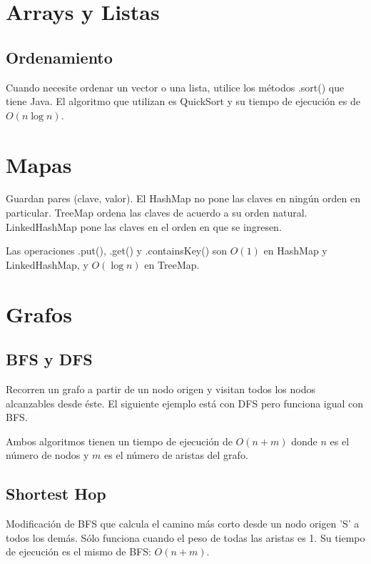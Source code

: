 \documentclass{article}
\begin{document}
\begin{multicols}{2}
\section{Arrays y Listas}
	\subsection{Ordenamiento}
	Cuando necesite ordenar un vector o una lista, utilice los métodos .sort() que tiene 		Java. El algoritmo que utilizan es QuickSort y su tiempo de ejecución es de \( O(n\log n) \).
	

\section{Mapas}
Guardan pares (clave, valor). El HashMap no pone las claves en ningún orden en particular. TreeMap ordena las claves de acuerdo a su orden natural. LinkedHashMap pone las claves en el orden en que se ingresen.

Las operaciones .put(), .get() y .containsKey() son \( O(1) \) en HashMap y LinkedHashMap, y \( O(\log n)\) en TreeMap.


\section{Grafos}
	\subsection{BFS y DFS}
	Recorren un grafo a partir de un nodo origen y visitan todos los nodos alcanzables desde éste. El siguiente ejemplo está con DFS pero funciona igual con BFS. 
	
	Ambos algoritmos tienen un tiempo de ejecución de \( O(n + m) \) donde \( n \) es el número de nodos y \( m \) es el número de aristas del grafo.
	

	\subsection{Shortest Hop}
	Modificación de BFS que calcula el camino más corto desde un nodo origen 'S' a todos los demás. Sólo funciona cuando el peso de todas las aristas es 1. Su tiempo de ejecución es el mismo de BFS: \( O(n + m) \).
	
	

\end{multicols}
\end{document}
